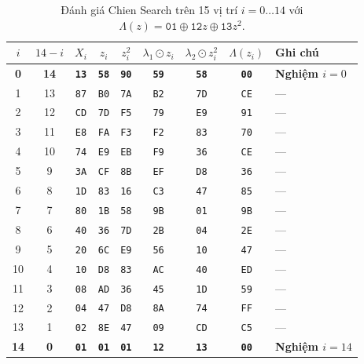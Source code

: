 \documentclass[11pt,a4paper]{report}
\begin{document}
\begin{table}[!htb]
\centering
\caption{Đánh giá Chien Search trên 15 vị trí $i = 0 \dots 14$ với $\Lambda(z) = \texttt{01} \oplus \texttt{12}z \oplus \texttt{13}z^2$.}
\label{tab:worked_chien}
\scriptsize
\setlength{\tabcolsep}{4pt}
\renewcommand{\arraystretch}{0.96}
\begin{tabular}{@{} c c c c c c c c l @{}}
\toprule
$i$ & $14-i$ & $X_i$ & $z_i$ & $z_i^2$ & $\lambda_1 \odot z_i$ & $\lambda_2 \odot z_i^2$ & $\Lambda(z_i)$ & Ghi chú \\
\midrule
\textbf{0} & \textbf{14} & \textbf{\texttt{13}} & \textbf{\texttt{58}} & \textbf{\texttt{90}} & \textbf{\texttt{59}} & \textbf{\texttt{58}} & \textbf{\texttt{00}} & \textbf{Nghiệm $i=0$} \\
1 & 13 & \texttt{87} & \texttt{B0} & \texttt{7A} & \texttt{B2} & \texttt{7D} & \texttt{CE} & --- \\
2 & 12 & \texttt{CD} & \texttt{7D} & \texttt{F5} & \texttt{79} & \texttt{E9} & \texttt{91} & --- \\
3 & 11 & \texttt{E8} & \texttt{FA} & \texttt{F3} & \texttt{F2} & \texttt{83} & \texttt{70} & --- \\
4 & 10 & \texttt{74} & \texttt{E9} & \texttt{EB} & \texttt{F9} & \texttt{36} & \texttt{CE} & --- \\
5 & 9  & \texttt{3A} & \texttt{CF} & \texttt{8B} & \texttt{EF} & \texttt{D8} & \texttt{36} & --- \\
6 & 8  & \texttt{1D} & \texttt{83} & \texttt{16} & \texttt{C3} & \texttt{47} & \texttt{85} & --- \\
7 & 7  & \texttt{80} & \texttt{1B} & \texttt{58} & \texttt{9B} & \texttt{01} & \texttt{9B} & --- \\
8 & 6  & \texttt{40} & \texttt{36} & \texttt{7D} & \texttt{2B} & \texttt{04} & \texttt{2E} & --- \\
9 & 5  & \texttt{20} & \texttt{6C} & \texttt{E9} & \texttt{56} & \texttt{10} & \texttt{47} & --- \\
10 & 4 & \texttt{10} & \texttt{D8} & \texttt{83} & \texttt{AC} & \texttt{40} & \texttt{ED} & --- \\
11 & 3 & \texttt{08} & \texttt{AD} & \texttt{36} & \texttt{45} & \texttt{1D} & \texttt{59} & --- \\
12 & 2 & \texttt{04} & \texttt{47} & \texttt{D8} & \texttt{8A} & \texttt{74} & \texttt{FF} & --- \\
13 & 1 & \texttt{02} & \texttt{8E} & \texttt{47} & \texttt{09} & \texttt{CD} & \texttt{C5} & --- \\
\textbf{14} & \textbf{0} & \textbf{\texttt{01}} & \textbf{\texttt{01}} & \textbf{\texttt{01}} & \textbf{\texttt{12}} & \textbf{\texttt{13}} & \textbf{\texttt{00}} & \textbf{Nghiệm $i=14$} \\
\bottomrule
\end{tabular}
\end{table}
\end{document}
